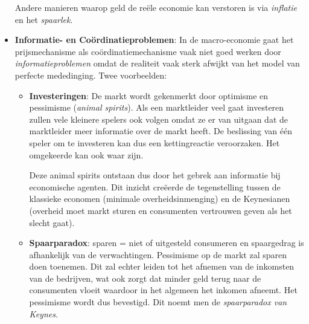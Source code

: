 \begin{itemize}
    Andere manieren waarop geld de re\"ele economie kan verstoren is via \textit{inflatie} en het \textit{spaarlek}.

    \item \textbf{Informatie- en Co\"ordinatieproblemen}: In de macro-economie gaat het prijsmechanisme als co\"ordinatiemechanisme vaak niet goed werken door \textit{informatieproblemen} omdat de realiteit vaak sterk afwijkt van het model van perfecte mededinging. Twee voorbeelden:
    \begin{itemize}
        \item \textbf{Investeringen}: De markt wordt gekenmerkt door optimisme en pessimisme (\textit{animal spirits}). Als een marktleider veel gaat investeren zullen vele kleinere spelers ook volgen omdat ze er van uitgaan dat de marktleider meer informatie over de markt heeft. De beslissing van \'e\'en speler om te investeren kan dus een kettingreactie veroorzaken. Het omgekeerde kan ook waar zijn.

        Deze animal spirits ontstaan dus door het gebrek aan informatie bij economische agenten. Dit inzicht cre\"eerde de tegenstelling tussen de klassieke economen (minimale overheidsinmenging) en de Keynesianen (overheid moet markt sturen en consumenten vertrouwen geven als het slecht gaat).

        \item \textbf{Spaarparadox}: sparen = niet of uitgesteld consumeren en spaargedrag is afhankelijk van de verwachtingen. Pessimisme op de markt zal sparen doen toenemen. Dit zal echter leiden tot het afnemen van de inkomsten van de bedrijven, wat ook zorgt dat minder geld terug naar de consumenten vloeit waardoor in het algemeen het inkomen afneemt. Het pessimisme wordt dus bevestigd. Dit noemt men de \textit{spaarparadox van Keynes}.
    \end{itemize}
\end{itemize}

